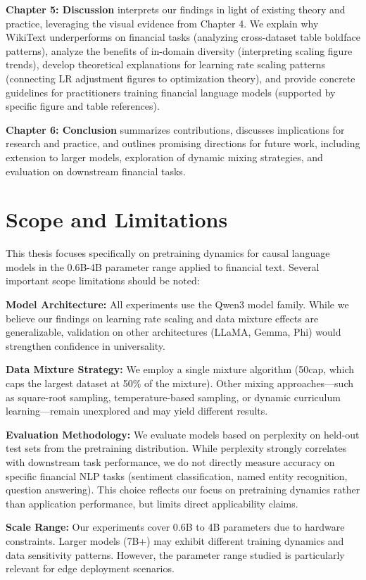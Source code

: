 \textbf{Chapter 5: Discussion} interprets our findings in light of existing theory and practice, leveraging the visual evidence from Chapter 4. We explain why WikiText underperforms on financial tasks (analyzing cross-dataset table boldface patterns), analyze the benefits of in-domain diversity (interpreting scaling figure trends), develop theoretical explanations for learning rate scaling patterns (connecting LR adjustment figures to optimization theory), and provide concrete guidelines for practitioners training financial language models (supported by specific figure and table references).

\textbf{Chapter 6: Conclusion} summarizes contributions, discusses implications for research and practice, and outlines promising directions for future work, including extension to larger models, exploration of dynamic mixing strategies, and evaluation on downstream financial tasks.

\section{Scope and Limitations}

This thesis focuses specifically on pretraining dynamics for causal language models in the 0.6B-4B parameter range applied to financial text. Several important scope limitations should be noted:

\textbf{Model Architecture:} All experiments use the Qwen3 model family. While we believe our findings on learning rate scaling and data mixture effects are generalizable, validation on other architectures (LLaMA, Gemma, Phi) would strengthen confidence in universality.

\textbf{Data Mixture Strategy:} We employ a single mixture algorithm (50cap, which caps the largest dataset at 50\% of the mixture). Other mixing approaches—such as square-root sampling, temperature-based sampling, or dynamic curriculum learning—remain unexplored and may yield different results.

\textbf{Evaluation Methodology:} We evaluate models based on perplexity on held-out test sets from the pretraining distribution. While perplexity strongly correlates with downstream task performance, we do not directly measure accuracy on specific financial NLP tasks (sentiment classification, named entity recognition, question answering). This choice reflects our focus on pretraining dynamics rather than application performance, but limits direct applicability claims.

\textbf{Scale Range:} Our experiments cover 0.6B to 4B parameters due to hardware constraints. Larger models (7B+) may exhibit different training dynamics and data sensitivity patterns. However, the parameter range studied is particularly relevant for edge deployment scenarios.

